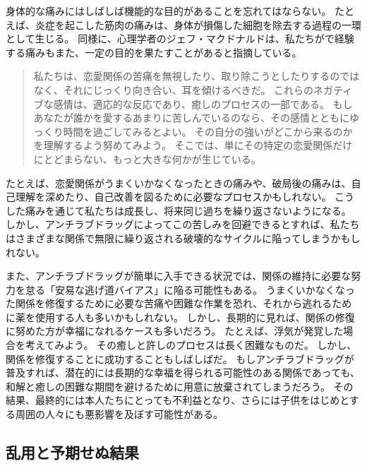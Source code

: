 \documentclass[paper=a4,book,openany]{jlreq}
\newcommand{\ig}[1]{}           %
\begin{document}
身体的な痛みにはしばしば機能的な目的があることを忘れてはならない。
たとえば、炎症を起こした筋肉の痛みは、身体が損傷した細胞を除去する過程の一環として生じる。
同様に、心理学者のジェフ・マクドナルド\ig{(Geoff MacDonald)}は、私たちがで経験する痛みもまた、一定の目的を果たすことがあると指摘している。

\begin{quote}
私たちは、恋愛関係の苦痛を無視したり、取り除こうとしたりするのではなく、それにじっくり向き合い、耳を傾けるべきだ。
これらのネガティブな感情は、適応的な反応であり、癒しのプロセスの一部である。
もしあなたが誰かを愛するあまりに苦しんでいるのなら、その感情とともにゆっくり時間を過ごしてみるとよい。
その自分の強いがどこから来るのかを理解するよう努めてみよう。
そこでは、単にその特定の恋愛関係だけにとどまらない、もっと大きな何かが生じている。
\citep{lawson17:_why_does_love_hurt_so_much}
\end{quote}

たとえば、恋愛関係がうまくいかなくなったときの痛みや、破局後の痛みは、自己理解を深めたり、自己改善を図るために必要なプロセスかもしれない。
こうした痛みを通じて私たちは成長し、将来同じ過ちを繰り返さないようになる。
しかし、アンチラブドラッグによってこの苦しみを回避できるとすれば、私たちはさまざまな関係で無限に繰り返される破壊的なサイクルに陥ってしまうかもしれない。

また、アンチラブドラッグが簡単に入手できる状況では、関係の維持に必要な努力を怠る「安易な逃げ道バイアス」に陥る可能性もある。
うまくいかなくなった関係を修復するために必要な苦痛や困難な作業を恐れ、それから逃れるために薬を使用する人も多いかもしれない。
しかし、長期的に見れば、関係の修復に努めた方が幸福になれるケースも多いだろう。
たとえば、浮気が発覚した場合を考えてみよう。
その癒しと許しのプロセスは長く困難なものだ。
しかし、関係を修復することに成功することもしばしばだ。
もしアンチラブドラッグが普及すれば、潜在的には長期的な幸福を得られる可能性のある関係であっても、和解と癒しの困難な期間を避けるために用意に放棄されてしまうだろう。
その結果、最終的には本人たちにとっても不利益となり、さらには子供をはじめとする周囲の人々にも悪影響を及ぼす可能性がある。

\subsection{乱用と予期せぬ結果}
\end{document}
